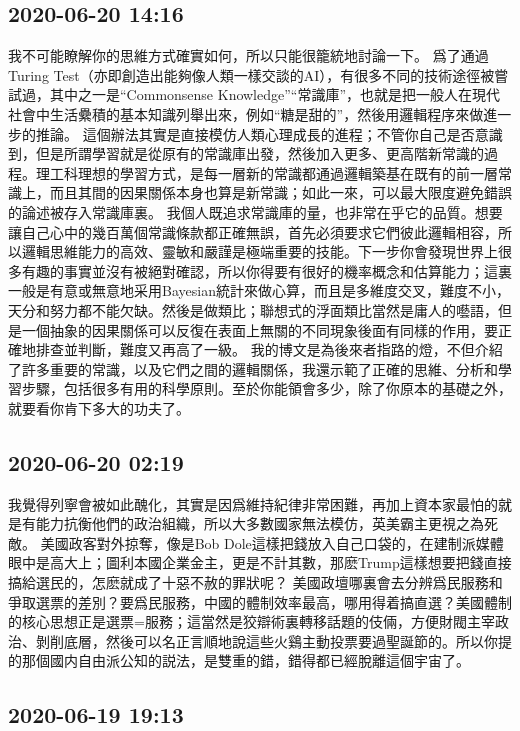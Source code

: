 \documentclass[twocolumn]{ctexart}
\begin{document}
\subsection*{2020-06-20 14:16}

我不可能瞭解你的思維方式確實如何，所以只能很籠統地討論一下。
爲了通過Turing Test（亦即創造出能夠像人類一樣交談的AI），有很多不同的技術途徑被嘗試過，其中之一是“Commonsense Knowledge”“常識庫”，也就是把一般人在現代社會中生活纍積的基本知識列舉出來，例如“糖是甜的”，然後用邏輯程序來做進一步的推論。
這個辦法其實是直接模仿人類心理成長的進程；不管你自己是否意識到，但是所謂學習就是從原有的常識庫出發，然後加入更多、更高階新常識的過程。理工科理想的學習方式，是每一層新的常識都通過邏輯築基在既有的前一層常識上，而且其間的因果關係本身也算是新常識；如此一來，可以最大限度避免錯誤的論述被存入常識庫裏。
我個人既追求常識庫的量，也非常在乎它的品質。想要讓自己心中的幾百萬個常識條款都正確無誤，首先必須要求它們彼此邏輯相容，所以邏輯思維能力的高效、靈敏和嚴謹是極端重要的技能。下一步你會發現世界上很多有趣的事實並沒有被絕對確認，所以你得要有很好的機率概念和估算能力；這裏一般是有意或無意地采用Bayesian統計來做心算，而且是多維度交叉，難度不小，天分和努力都不能欠缺。然後是做類比；聯想式的浮面類比當然是庸人的囈語，但是一個抽象的因果關係可以反復在表面上無關的不同現象後面有同樣的作用，要正確地排查並判斷，難度又再高了一級。
我的博文是為後來者指路的燈，不但介紹了許多重要的常識，以及它們之間的邏輯關係，我還示範了正確的思維、分析和學習步驟，包括很多有用的科學原則。至於你能領會多少，除了你原本的基礎之外，就要看你肯下多大的功夫了。
\subsection*{2020-06-20 02:19}

我覺得列寧會被如此醜化，其實是因爲維持紀律非常困難，再加上資本家最怕的就是有能力抗衡他們的政治組織，所以大多數國家無法模仿，英美霸主更視之為死敵。
美國政客對外掠奪，像是Bob Dole這樣把錢放入自己口袋的，在建制派媒體眼中是高大上；圖利本國企業金主，更是不計其數，那麽Trump這樣想要把錢直接搞給選民的，怎麽就成了十惡不赦的罪狀呢？
美國政壇哪裏會去分辨爲民服務和爭取選票的差別？要爲民服務，中國的體制效率最高，哪用得着搞直選？美國體制的核心思想正是選票=服務；這當然是狡辯術裏轉移話題的伎倆，方便財閥主宰政治、剝削底層，然後可以名正言順地說這些火鷄主動投票要過聖誕節的。所以你提的那個國内自由派公知的説法，是雙重的錯，錯得都已經脫離這個宇宙了。
\subsection*{2020-06-19 19:13}
\end{document}
